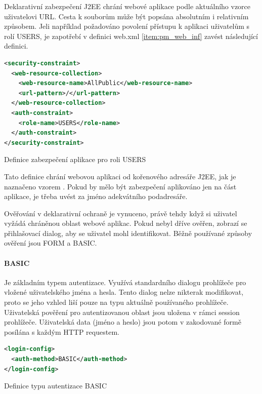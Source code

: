 \documentclass[thesis=M,czech]{FITthesis}[2012/06/26]
\begin{document}
Deklarativní zabezpečení J2EE chrání webové aplikace podle aktuálního vzorce uživatelovi URL. Cesta k souborům může být popsána absolutním i relativním způsobem. Jeli například požadováno povolení přístupu k aplikaci uživatelům s rolí USERS, je zapotřebí v definici web.xml \ref{item:pm_web_inf} zavést následující definici.

\begin{algorithm}[H]	
	\begin{lstlisting}[language = XML]  
<security-constraint> 
  <web-resource-collection> 
    <web-resource-name>AllPublic</web-resource-name> 
    <url-pattern>/</url-pattern> 
  </web-resource-collection> 
  <auth-constraint> 
    <role-name>USERS</role-name> 
  </auth-constraint> 
</security-constraint>
	\end{lstlisting}
	\caption{Definice zabezpečení aplikace pro roli USERS}	
	\label{code:j2ee_definition}
	\small Tato definice chrání webovou aplikaci od kořenového adresáře J2EE, jak je naznačeno vzorem \uv{\textbackslash}. Pokud by mělo být zabezpečení aplikováno jen na část aplikace, je třeba uvést za \uv{\textbackslash} jméno adekvátního podadresáře.
\end{algorithm}	

Ověřování v deklarativní ochraně je vynuceno, právě tehdy když si uživatel vyžádá chráněnou oblast webové aplikac. Pokud nebyl dříve ověřen, zobrazí se přihlašovací dialog, aby se uživatel mohl identifikovat. Běžně používané způsoby ověření jsou FORM a BASIC. 

\paragraph{BASIC} Je základním typem autentizace. Využívá standardního dialogu prohlížeče pro vložené uživatelského jména a hesla. Tento dialog nelze nikterak modifikovat, proto se jeho vzhled liší pouze na typu aktuálně používaného prohlížeče. Uživatelská pověření pro autentizovanou oblast jsou uložena v rámci session prohlížeče. Uživatelská data (jméno a heslo) jsou potom v zakodované formě posílána s každým HTTP requestem.

\begin{algorithm}[H]	
	\begin{lstlisting}[language = XML]  
<login-config> 
  <auth-method>BASIC</auth-method> 
</login-config>
	\end{lstlisting}
	\caption{Definice typu autentizace BASIC}	
	\label{code:auth_basic_def}
\end{algorithm}	
\end{document}
